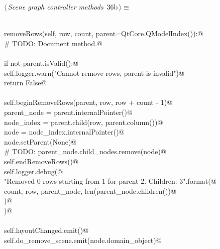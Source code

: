 \documentclass[
    a4paper,      %
    10pt,         %
    openright,    %
    notitlepage,  %
    parskip=half, %
]{scrreprt}       %
\theoremstyle{definition}                    %
\begin{document}
\begin{flushleft} \small
\begin{minipage}{\linewidth}\label{scrap43}\raggedright\small
{} $\langle\,${\itshape Scene graph controller methods}\nobreak\ {\footnotesize {36b}}$\,\rangle\equiv$
\vspace{-1ex}
\begin{list}{}{} \item
\mbox{}\lstinline@@\\
\mbox{}\lstinline@def removeRows(self, row, count, parent=QtCore.QModelIndex()):@\\
\mbox{}\lstinline@    # TODO: Document method.@\\
\mbox{}\lstinline@@\\
\mbox{}\lstinline@    if not parent.isValid():@\\
\mbox{}\lstinline@        self.logger.warn("Cannot remove rows, parent is invalid")@\\
\mbox{}\lstinline@        return False@\\
\mbox{}\lstinline@@\\
\mbox{}\lstinline@    self.beginRemoveRows(parent, row, row + count - 1)@\\
\mbox{}\lstinline@    parent_node = parent.internalPointer()@\\
\mbox{}\lstinline@    node_index = parent.child(row, parent.column())@\\
\mbox{}\lstinline@    node       = node_index.internalPointer()@\\
\mbox{}\lstinline@    node.setParent(None)@\\
\mbox{}\lstinline@    # TODO: parent_node.child_nodes.remove(node)@\\
\mbox{}\lstinline@    self.endRemoveRows()@\\
\mbox{}\lstinline@    self.logger.debug(@\\
\mbox{}\lstinline@        "Removed {0} rows starting from {1} for parent {2}. Children: {3}".format(@\\
\mbox{}\lstinline@            count, row, parent_node, len(parent_node.children())@\\
\mbox{}\lstinline@        )@\\
\mbox{}\lstinline@    )@\\
\mbox{}\lstinline@@\\
\mbox{}\lstinline@    self.layoutChanged.emit()@\\
\mbox{}\lstinline@    self.do_remove_scene.emit(node.domain_object)@\\

\end{list}
\end{minipage}
\end{flushleft}
\end{document}
